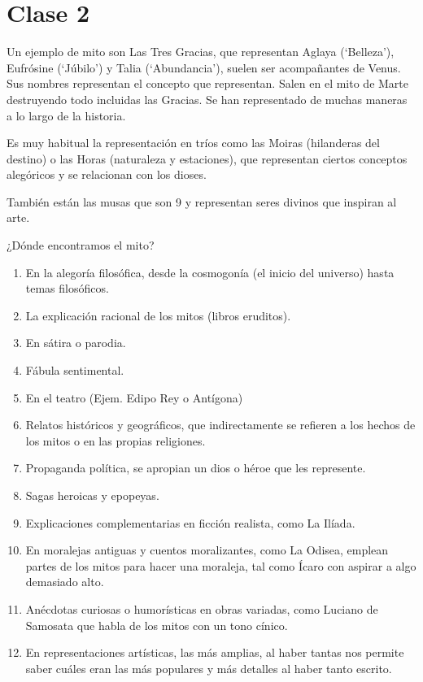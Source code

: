 \chapter{Clase 2}\label{ch:clase2}
Un ejemplo de mito son Las Tres Gracias, que representan Aglaya (‘Belleza’), Eufrósine (‘Júbilo’) y Talia (‘Abundancia’), suelen ser acompañantes de Venus. Sus nombres representan el concepto que representan. Salen en el mito de Marte destruyendo todo incluidas las Gracias. Se han representado de muchas maneras a lo largo de la historia.

Es muy habitual la representación en tríos como las Moiras (hilanderas del destino) o las Horas (naturaleza y estaciones), que representan ciertos conceptos alegóricos y se relacionan con los dioses.

También están las musas que son 9 y representan seres divinos que inspiran al arte.

¿Dónde encontramos el mito?
\begin{enumerate}
  \item En la alegoría filosófica, desde la cosmogonía (el inicio del universo) hasta temas filosóficos.
  \item La explicación racional de los mitos (libros eruditos).
  \item En sátira o parodia.
  \item Fábula sentimental.
  \item En el teatro (Ejem. Edipo Rey o Antígona)
  \item Relatos históricos y geográficos, que indirectamente se refieren a los hechos de los mitos o en las propias religiones.
  \item Propaganda política, se apropian un dios o héroe que les represente.
  \item Sagas heroicas y epopeyas.
  \item Explicaciones complementarias en ficción realista, como La Ilíada.
  \item En moralejas antiguas y cuentos moralizantes, como La Odisea, emplean partes de los mitos para hacer una moraleja, tal como Ícaro con aspirar a algo demasiado alto.
  \item Anécdotas curiosas o humorísticas en obras variadas, como Luciano de Samosata que habla de los mitos con un tono cínico.
  \item En representaciones artísticas, las más amplias, al haber tantas nos permite saber cuáles eran las más populares y más detalles al haber tanto escrito.
\end{enumerate}

